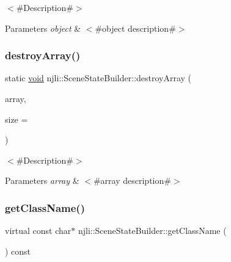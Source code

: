 $<$\#\+Description\#$>$


\begin{DoxyParams}{Parameters}
{\em object} & $<$\#object description\#$>$ \\
\hline
\end{DoxyParams}
\mbox{\label{classnjli_1_1_scene_state_builder_ae519e8d5d3a7d5c581a867a5495b58b9}} 
\subsubsection{\texorpdfstring{destroy\+Array()}{destroyArray()}}
{\footnotesize\ttfamily static \mbox{\hyperlink{_thread_8h_af1e856da2e658414cb2456cb6f7ebc66}{void}} njli\+::\+Scene\+State\+Builder\+::destroy\+Array (\begin{DoxyParamCaption}\item[{\mbox{\hyperlink{classnjli_1_1_scene_state_builder}{Scene\+State\+Builder}} $\ast$$\ast$}]{array,  }\item[{const \mbox{\hyperlink{_util_8h_a10e94b422ef0c20dcdec20d31a1f5049}{u32}}}]{size = {} }\end{DoxyParamCaption})\hspace{0.3cm}{\ttfamily [static]}}

$<$\#\+Description\#$>$


\begin{DoxyParams}{Parameters}
{\em array} & $<$\#array description\#$>$ \\
\hline
\end{DoxyParams}
\mbox{\label{classnjli_1_1_scene_state_builder_a6321171363bce444496fca0e11290835}} 
\subsubsection{\texorpdfstring{get\+Class\+Name()}{getClassName()}}
{\footnotesize\ttfamily virtual const char$\ast$ njli\+::\+Scene\+State\+Builder\+::get\+Class\+Name (\begin{DoxyParamCaption}{ }\end{DoxyParamCaption}) const\hspace{0.3cm}{\ttfamily [virtual]}}

